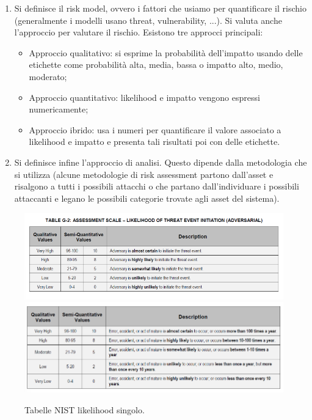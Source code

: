 \begin{enumerate}
    \item Si definisce il risk model, ovvero i fattori che usiamo per quantificare il rischio (generalmente i modelli usano threat, vulnerability, ...). Si valuta anche l'approccio per valutare il rischio. Esistono tre approcci principali:
    \begin{itemize}
        \item Approccio qualitativo: si esprime la probabilità dell'impatto usando delle etichette come probabilità alta, media, bassa o impatto alto, medio, moderato;
        \item Approccio quantitativo: likelihood e impatto vengono espressi numericamente;
        \item Approccio ibrido: usa i numeri per quantificare il valore associato a likelihood e impatto e presenta tali risultati poi con delle etichette. 
    \end{itemize}
    \item Si definisce infine l'approccio di analisi. Questo dipende dalla metodologia che si utilizza (alcune metodologie di risk assessment partono dall'asset e risalgono a tutti i possibili attacchi o che partano dall'individuare i possibili attaccanti e legano le possibili categorie trovate agli asset del sistema).
\end{enumerate}

\begin{figure}
    \centering
    \includegraphics[width=1\textwidth]{images/11-1.png}
    \includegraphics[width=1\textwidth]{images/11-2.png}
    \caption{Tabelle NIST likelihood singolo.}
    \label{fig:11-1}
\end{figure}

